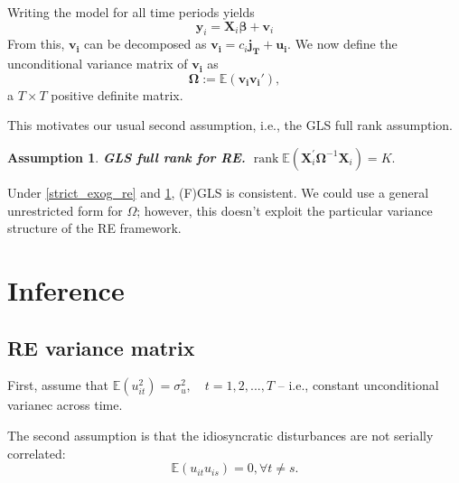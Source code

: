 \documentclass[11pt, a4paper]{report}
\theoremstyle{plain}
\newtheorem{assump}[thm]{Assumption}
\theoremstyle{plain}
\theoremstyle{remark}
\begin{document}
Writing the model for all time periods yields
\begin{equation}
    \mathbf{y}_{i}=\mathbf{X}_{i} \boldsymbol{\beta}+\mathbf{v}_{i}
\end{equation}
From this, $\mathbf{v_i}$ can be decomposed as $\mathbf{v_i} = c_i \mathbf{j_T + u_i}.$ We now define the unconditional variance matrix of $\mathbf{v_i}$ as
$$\mathbf{\Omega} := \mathbb{E}(\mathbf{v_i v_i'}),$$ 
a $T \times T$ positive definite matrix.

This motivates our usual second assumption, i.e., the GLS full rank assumption.
\begin{assump} \label{full_rank_re}
    \textbf{GLS full rank for RE.} $\operatorname{rank} \mathbb{E}\left(\mathbf{X}_{i}^{\prime} \mathbf{\Omega}^{-1} \mathbf{X}_{i}\right)=K.$
\end{assump}

Under \ref{strict_exog_re} and \ref{full_rank_re}, (F)GLS is consistent. We could use a general unrestricted form for $\Omega$; however, this doesn't exploit the particular variance structure of the RE framework. 

\section{Inference}

\subsection{RE variance matrix}

First, assume that $\mathbb{E}(u_{it}^2) = \sigma_u^2, \quad t = 1,2,..., T$ -- i.e., constant unconditional varianec across time.

The second assumption is that the idiosyncratic disturbances are not serially correlated:
$$ \mathbb{E}(u_{it} u_{is}) = 0, \forall t \neq s.$$ 
\end{document}
